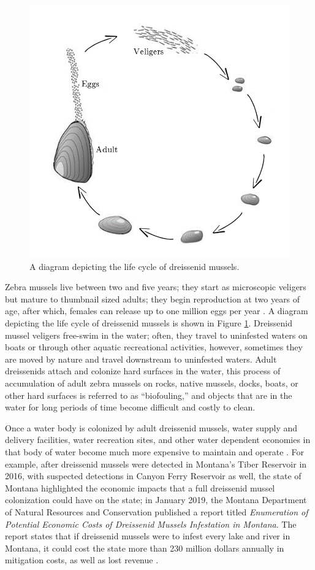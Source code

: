 \documentclass[12pt]{article}\usepackage[]{graphicx}\usepackage[]{color}
\begin{document}
\begin{figure}[]
	\centering
	\includegraphics[scale = 0.6]{images/lifecycle}
	\caption{A diagram depicting the life cycle of dreissenid mussels.}
	\label{fig:lifecycle}
\end{figure}

Zebra mussels live between two and five years; they start as microscopic veligers but mature to thumbnail sized adults; they begin reproduction at two years of age, after which, females can release up to one million eggs per year \cite{NPS}. A diagram depicting the life cycle of dreissenid mussels is shown in Figure \ref{fig:lifecycle}. Dreissenid mussel veligers free-swim in the water; often, they travel to uninfested waters on boats or through other aquatic recreational activities, however, sometimes they are moved by nature and travel downstream to uninfested waters. Adult dreissenids attach and colonize hard surfaces in the water, this process of accumulation of adult zebra mussels on rocks, native mussels, docks, boats, or other hard surfaces is referred to as ``biofouling,'' and objects that are in the water for long periods of time become difficult and costly to clean.

Once a water body is colonized by adult dreissenid mussels, water supply and delivery facilities, water recreation sites, and other water dependent economies in that body of water become much more expensive to maintain and operate \cite{BOR}. For example, after dreissenid mussels were detected in Montana's Tiber Reservoir in 2016, with suspected detections in Canyon Ferry Reservoir as well, the state of Montana highlighted the economic impacts that a full dreissenid mussel colonization could have on the state; in January 2019, the Montana Department of Natural Resources and Conservation published a report titled \textit{Enumeration of Potential Economic Costs of Dreissenid Mussels Infestation in Montana}. The report states that if dreissenid mussels were to infest every lake and river in Montana, it could cost the state more than 230 million dollars annually in mitigation costs, as well as lost revenue \cite{MT}. 
\end{document}
